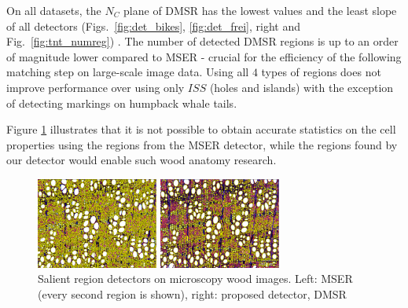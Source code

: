 \documentclass[conference,compsoc]{IEEEtran}
\begin{document}
On all datasets, the $N_C$ plane of DMSR has the lowest values and the least slope of all detectors (Figs.~\ref{fig:det_bikes}, \ref{fig:det_frei}, right and Fig.~\ref{fig:tnt_numreg}) \cite{elena_ranguelova_2016_45156}. 
The number of detected DMSR regions is up to an order of magnitude lower compared to MSER - crucial for the efficiency of the following matching step on large-scale image data.
Using all $4$ types of regions does not improve performance over using only $ISS$ (holes and islands) with the exception of detecting markings on humpback whale tails. 



Figure \ref{fig:wood}  illustrates that it is not possible to obtain accurate statistics on the cell properties using the regions from the MSER  detector, while the regions found by our detector would enable such wood anatomy research.  
\begin{figure}[htb]

\begin{minipage}[b]{.49\linewidth}
  \centering
  \centerline{\includegraphics[width=4.0cm]{mserWood}}
\end{minipage}
\hfill
\begin{minipage}[b]{0.49\linewidth}
  \centering
  \centerline{\includegraphics[width=4.0cm]{dmsrWood}}
\end{minipage}
\caption{Salient region detectors on microscopy wood images. Left: MSER (every second region is shown), right: proposed detector, DMSR}
\label{fig:wood}
%
\end{figure}
\vspace{-0.4cm}
\end{document}
